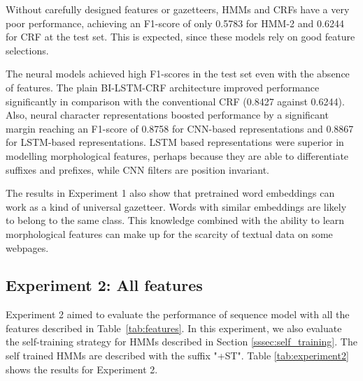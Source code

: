 \documentclass{nle}
\begin{document}
Without carefully designed features or gazetteers, HMMs and CRFs have a very 
poor performance, achieving an F1-score of only 0.5783 for HMM-2 and 0.6244 for CRF
at the test set. This is expected, since these models rely on good feature selections.

The neural models achieved high F1-scores in the test
set even with the absence of features. The plain BI-LSTM-CRF architecture improved performance 
significantly in comparison with the conventional CRF (0.8427 against 0.6244). 
Also, neural character representations boosted performance by a significant margin
reaching an F1-score of 0.8758 for CNN-based representations and 0.8867 for LSTM-based
representations. LSTM based representations were superior in modelling
morphological features, perhaps because they are able to differentiate suffixes 
and prefixes, while CNN filters are position invariant. 

The results in Experiment 1 also show that pretrained word embeddings can work 
as a kind of universal gazetteer. Words with similar embeddings are likely to 
belong to the same class. This knowledge combined with the ability to learn 
morphological features can make up for the scarcity of textual data on some 
webpages.

\subsection{Experiment 2: All features}

Experiment 2 aimed to evaluate the performance of sequence model with all
the features described in Table~\ref{tab:features}. In this experiment, we
also evaluate the self-training strategy for HMMs described in Section 
\ref{sssec:self_training}. The self trained HMMs are described with the 
suffix "+ST". Table \ref{tab:experiment2} shows the results for Experiment 2.
\end{document}
